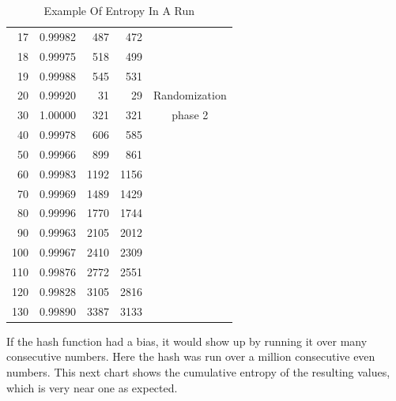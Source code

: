 \documentclass[preprint]{sigplanconf}
\begin{document}
\begin{table} [ht]
\begin{center}
\begin{tabular}{|r|r|r|r|c|}
            17            & 0.99982          & 487           & 472            &                \\
            18            & 0.99975          & 518           & 499            &                \\
            19            & 0.99988          & 545           & 531            &                \\
            \hline
            20            & 0.99920          & 31            & 29             & Randomization  \\
            30            & 1.00000          & 321           & 321            & phase 2        \\
            40            & 0.99978          & 606           & 585            &                \\
            50            & 0.99966          & 899           & 861            &                \\
            60            & 0.99983          & 1192          & 1156           &                \\
            70            & 0.99969          & 1489          & 1429           &                \\
            80            & 0.99996          & 1770          & 1744           &                \\
            90            & 0.99963          & 2105          & 2012           &                \\
            100           & 0.99967          & 2410          & 2309           &                \\
            110           & 0.99876          & 2772          & 2551           &                \\
            120           & 0.99828          & 3105          & 2816           &                \\
            130           & 0.99890          & 3387          & 3133           &                \\
            \hline
        \end{tabular}
        \caption{Example Of Entropy In A Run}
        \label{tab-5}
    \end{center}
\end{table}

If the hash function had a bias, it would show up by running it over many consecutive numbers. Here the hash was run over a million consecutive even numbers. This next chart shows the cumulative entropy of the resulting values, which is very near one as expected.
\end{document}
